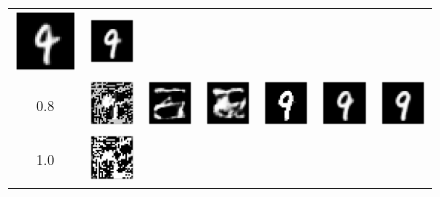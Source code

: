 \begin{figure}[h]
\begin{tabular}{cccc|ccc}
        \includegraphics[width=0.1\linewidth]{pics/3_adv_att/mnist_MCMC/mnist_MCMC_adv_rec_3_rad_0.6.pdf} &
        \includegraphics[width=0.1\linewidth]{pics/3_adv_att/mnist_MCMC/mnist_MCMC_adv_rec_t_3_rad_0.6.pdf} \\ 
        0.8 & \includegraphics[width=0.1\linewidth]{pics/3_adv_att/mnist_MCMC/mnist_noMCMC_adv_3_rad_0.8.pdf} &
        \includegraphics[width=0.1\linewidth]{pics/3_adv_att/mnist_MCMC/mnist_noMCMC_adv_rec_3_rad_0.8.pdf} &
        \includegraphics[width=0.1\linewidth]{pics/3_adv_att/mnist_MCMC/mnist_noMCMC_adv_rec_t_3_rad_0.8.pdf} &
        \includegraphics[width=0.1\linewidth]{pics/3_adv_att/mnist_MCMC/mnist_MCMC_adv_3_rad_0.8.pdf} &
        \includegraphics[width=0.1\linewidth]{pics/3_adv_att/mnist_MCMC/mnist_MCMC_adv_rec_3_rad_0.8.pdf} &
        \includegraphics[width=0.1\linewidth]{pics/3_adv_att/mnist_MCMC/mnist_MCMC_adv_rec_t_3_rad_0.8.pdf} \\ 
        1.0 & \includegraphics[width=0.1\linewidth]{pics/3_adv_att/mnist_MCMC/mnist_noMCMC_adv_3_rad_1.0.pdf} & 

\end{tabular}
\end{figure}
